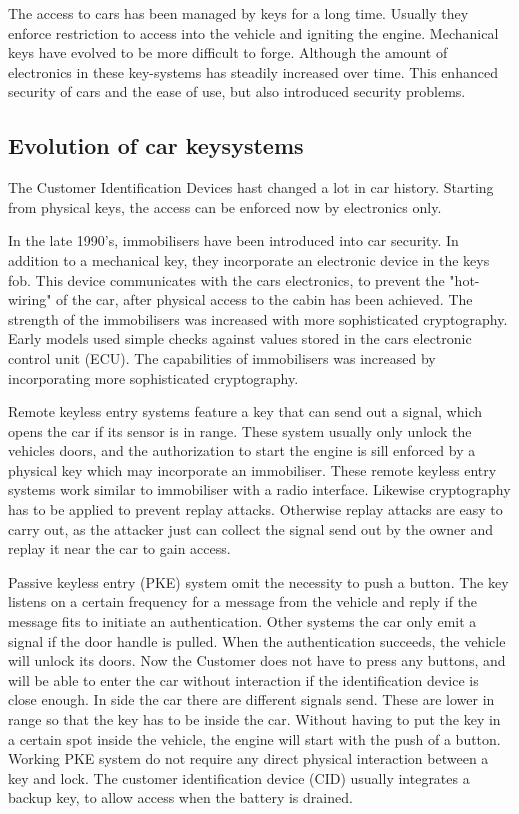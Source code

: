 The access to cars has been managed by keys for a long time. %
Usually they enforce restriction to access into the vehicle
and igniting the engine.
Mechanical keys have evolved to be more difficult to forge.
Although the amount of electronics in these key-systems has steadily increased over time.
This enhanced security of cars and the ease of use,
but also introduced security problems.

\subsection*{Evolution of car keysystems}
	The Customer Identification Devices hast changed a lot in car history.
	Starting from physical keys,
	the access can be enforced now by electronics only.

	In the late 1990's, immobilisers have been introduced into car security.
	In addition to a mechanical key, 
	they incorporate an electronic device in the keys fob.
	This device communicates with the cars electronics,
	to prevent the "hot-wiring" of the car,
	after physical access to the cabin has been achieved.
	The strength of the immobilisers was increased with more sophisticated cryptography.
	Early models used simple checks against values stored in the cars electronic control unit (ECU).
	The capabilities of immobilisers was increased by incorporating more
	sophisticated cryptography.

	Remote keyless entry systems feature a key that can send out a signal,
	which opens the car if its sensor is in range.
	These system usually only unlock the vehicles doors,
	and the authorization to start the engine is sill enforced by a physical key
	which may incorporate an immobiliser.
	These remote keyless entry systems work similar to immobiliser with a radio interface.
	Likewise cryptography has to be applied to prevent replay attacks.
	Otherwise replay attacks are easy to carry out,
	as the attacker just can collect the signal send out by the owner
	and replay it near the car to gain access.

	Passive keyless entry (PKE) system omit the necessity to push a button.
	The key listens on a certain frequency for a message from the vehicle
	and reply if the message fits to initiate an authentication.
	Other systems the car only emit a signal if the door handle is pulled.
	When the authentication succeeds, the vehicle will unlock its doors.
	Now the Customer does not have to press any buttons,
	and will be able to enter the car without interaction 
	if the identification device is close enough.
	In side the car there are different signals send.
	These are lower in range so that the key has to be inside the car.
	Without having to put the key in a certain spot inside the vehicle,
	the engine will start with the push of a button.
	Working PKE system do not require any direct physical interaction between
	a key and lock.
	The customer identification device (CID) usually integrates a backup key,
	to allow access when the battery is drained. 

